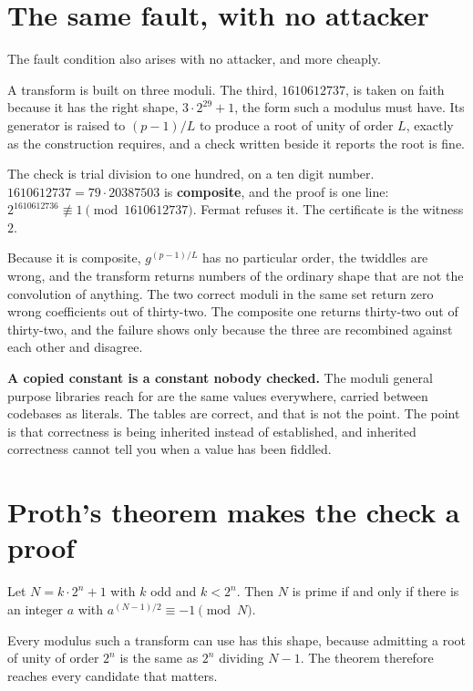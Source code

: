 \section{The same fault, with no attacker}

The fault condition also arises with no attacker, and more cheaply.

A transform is built on three moduli. The third, \(1610612737\), is taken on faith because it has the right shape, \(3 \cdot 2^{29} + 1\), the form such a modulus must have. Its generator is raised to \((p-1)/L\) to produce a root of unity of order \(L\), exactly as the construction requires, and a check written beside it reports the root is fine.

The check is trial division to one hundred, on a ten digit number. \(1610612737 = 79 \cdot 20387503\) is \textbf{composite}, and the proof is one line: \(2^{1610612736} \not\equiv 1 \pmod{1610612737}\). Fermat refuses it. The certificate is the witness \(2\).

Because it is composite, \(g^{(p-1)/L}\) has no particular order, the twiddles are wrong, and the transform returns numbers of the ordinary shape that are not the convolution of anything. The two correct moduli in the same set return zero wrong coefficients out of thirty-two. The composite one returns thirty-two out of thirty-two, and the failure shows only because the three are recombined against each other and disagree.

\textbf{A copied constant is a constant nobody checked.} The moduli general purpose libraries reach for are the same values everywhere, carried between codebases as literals. The tables are correct, and that is not the point. The point is that correctness is being inherited instead of established, and inherited correctness cannot tell you when a value has been fiddled.

\section{Proth's theorem makes the check a proof}

\begin{theorem}
Let \(N = k \cdot 2^n + 1\) with \(k\) odd and \(k < 2^n\). Then \(N\) is prime if and only if there is an integer \(a\) with \(a^{(N-1)/2} \equiv -1 \pmod N\).
\end{theorem}

Every modulus such a transform can use has this shape, because admitting a root of unity of order \(2^n\) is the same as \(2^n\) dividing \(N-1\). The theorem therefore reaches every candidate that matters.

